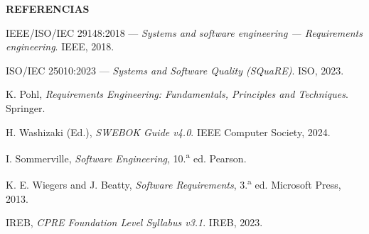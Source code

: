 \documentclass[11pt,a4paper]{article}
\newcounter{secc}
\newcommand{\secband}[1]{%
  \stepcounter{secc}\par\vspace{9pt}\noindent
  {\setlength{\fboxsep}{0pt}%
   \colorbox{uteqgold}{\parbox[c][20pt][c]{0.05\textwidth}{\centering\textbf{\color{white}\small \arabic{secc}}}}%
   \colorbox{uteqgreen}{\parbox[c][20pt][c]{0.95\textwidth}{\hspace{8pt}\textbf{\color{white}\small #1}}}%
  }\par\vspace{5pt}}
\begin{document}
\secband{REFERENCIAS}
\small
\begin{enumerate}[label={[\arabic*]}, leftmargin=2.6em]
\item IEEE/ISO/IEC 29148:2018 — \textit{Systems and software engineering — Requirements engineering}. IEEE, 2018.
\item ISO/IEC 25010:2023 — \textit{Systems and Software Quality (SQuaRE)}. ISO, 2023.
\item K. Pohl, \textit{Requirements Engineering: Fundamentals, Principles and Techniques}. Springer.
\item H. Washizaki (Ed.), \textit{SWEBOK Guide v4.0}. IEEE Computer Society, 2024.
\item I. Sommerville, \textit{Software Engineering}, 10.\textsuperscript{a} ed. Pearson.
\item K. E. Wiegers and J. Beatty, \textit{Software Requirements}, 3.\textsuperscript{a} ed. Microsoft Press, 2013.
\item IREB, \textit{CPRE Foundation Level Syllabus v3.1}. IREB, 2023.
\end{enumerate}
\end{document}
